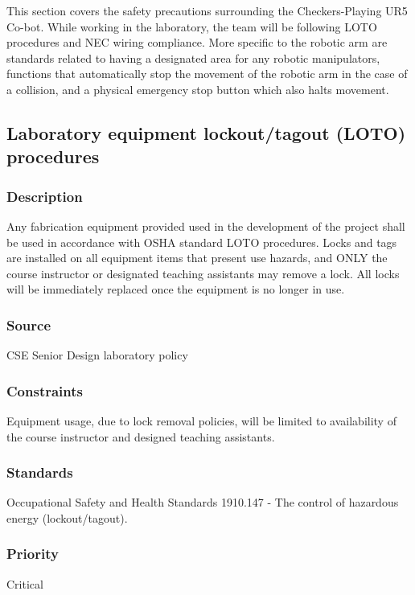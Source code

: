
This section covers the safety precautions surrounding the Checkers-Playing UR5 Co-bot. While working in the laboratory, the team will be following LOTO procedures and NEC wiring compliance. More specific to the robotic arm are standards related to having a designated area for any robotic manipulators, functions that automatically stop the movement of the robotic arm in the case of a collision, and a physical emergency stop button which also halts movement. 

\subsection{Laboratory equipment lockout/tagout (LOTO) procedures}
\subsubsection{Description}
Any fabrication equipment provided used in the development of the project shall be used in accordance with OSHA standard LOTO procedures. Locks and tags are installed on all equipment items that present use hazards, and ONLY the course instructor or designated teaching assistants may remove a lock. All locks will be immediately replaced once the equipment is no longer in use.
\subsubsection{Source}
CSE Senior Design laboratory policy
\subsubsection{Constraints}
Equipment usage, due to lock removal policies, will be limited to availability of the course instructor and designed teaching assistants.
\subsubsection{Standards}
Occupational Safety and Health Standards 1910.147 - The control of hazardous energy (lockout/tagout).
\subsubsection{Priority}
Critical

